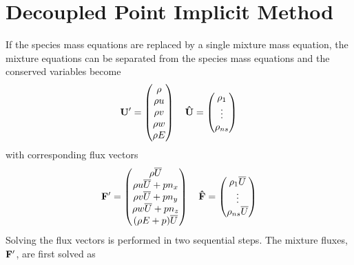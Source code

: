 \section{Decoupled Point Implicit Method}

If the species mass equations are replaced by a single mixture mass equation,
the mixture equations can be separated from the species mass
equations and the conserved variables become
\begin{equation}
	\mathbf U' =
  \begin{pmatrix}
		\rho \\
		\rho u \\
		\rho v \\
		\rho w \\
		\rho E
	\end{pmatrix} \quad
	\mathbf{\hat{U}} =
  \begin{pmatrix}
		\rho_1 \\
		\vdots \\
		\rho_{ns}
  \end{pmatrix}
  \label{dc-variables}
\end{equation}
with corresponding flux vectors
\begin{equation}
 	\mathbf F' = 
  \begin{pmatrix}
		\rho \overline{U} \\
		\rho u \overline{U} + p n_x\\
		\rho v \overline{U} + p n_y\\
		\rho w \overline{U} + p n_z\\
		(\rho E + p) \overline{U} \\
	\end{pmatrix} \quad
 	\mathbf{\hat{F}} = 
  \begin{pmatrix}
		\rho_1  \overline{U} \\
		\vdots \\
		\rho_{ns} \overline{U} \\
	\end{pmatrix}
  \label{dc-fluxes}
\end{equation}
Solving the flux vectors is performed in two sequential steps.  The mixture
fluxes, $\mathbf F'$, are first solved as
